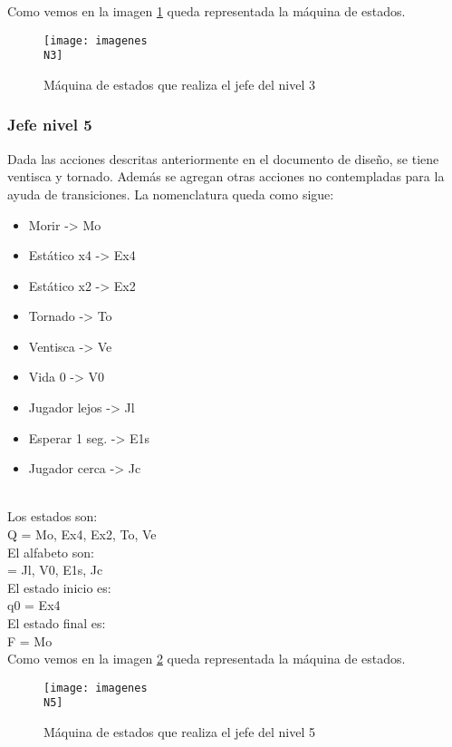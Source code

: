 Como vemos en la imagen \ref{fig:maqN3} queda representada la máquina de estados.
\begin{figure}
	\centering
	\caption{Máquina de estados que realiza el jefe del nivel 3}
	\label{fig:maqN3}
	\texttt{[image: imagenes\\N3]}
\end{figure}

\subsubsection{Jefe nivel 5}
Dada las acciones descritas anteriormente en el documento de diseño, se tiene ventisca y tornado. Además se agregan otras acciones no contempladas para la ayuda de transiciones.
La nomenclatura queda como sigue:
\\[1pt]

\begin{itemize}
	\item Morir -> Mo
	\item Estático x4 -> Ex4
	\item Estático x2 -> Ex2
	\item Tornado -> To
	\item Ventisca -> Ve
	\item Vida 0 -> V0
	\item Jugador lejos -> Jl
	\item Esperar 1 seg. -> E1s
	\item Jugador cerca -> Jc
\end{itemize}
\\[1pt]

Los estados son:
\\[1pt]
Q = {Mo, Ex4, Ex2, To, Ve}
\\[1pt]

El alfabeto son:
\\[1pt]
\sigma = {Jl, V0, E1s, Jc}
\\[1pt]

El estado inicio es:
\\[1pt]
q0 = {Ex4}
\\[1pt]

El estado final es:
\\[1pt]
F = {Mo}
\\[1pt]

Como vemos en la imagen \ref{fig:maqN5} queda representada la máquina de estados.

\begin{figure}
	\centering
	\caption{Máquina de estados que realiza el jefe del nivel 5}
	\label{fig:maqN5}
	\texttt{[image: imagenes\\N5]}
\end{figure}

